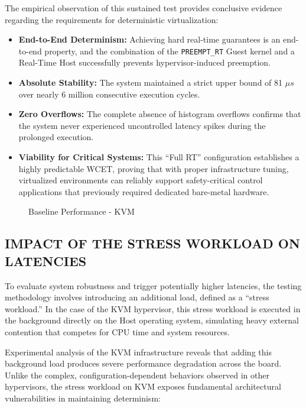 The empirical observation of this sustained test provides conclusive
evidence regarding the requirements for deterministic virtualization:

\begin{itemize}
\item
  \textbf{End-to-End Determinism:} Achieving hard real-time guarantees
  is an end-to-end property, and the combination of the
  \texttt{PREEMPT\_RT} Guest kernel and a Real-Time Host successfully
  prevents hypervisor-induced preemption.
\item
  \textbf{Absolute Stability:} The system maintained a strict upper
  bound of 81 $\mu s$ over nearly 6 million consecutive execution cycles.
\item
  \textbf{Zero Overflows:} The complete absence of histogram overflows
  confirms that the system never experienced uncontrolled latency spikes
  during the prolonged execution.
\item
  \textbf{Viability for Critical Systems:} This ``Full RT''
  configuration establishes a highly predictable WCET, proving that with
  proper infrastructure tuning, virtualized environments can reliably
  support safety-critical control applications that previously required
  dedicated bare-metal hardware.
\end{itemize}

\begin{figure}
\centering

\caption{Baseline Performance - KVM}
\end{figure}

\subsection{IMPACT OF THE STRESS WORKLOAD ON
LATENCIES}\label{impact-of-the-stress-workload-on-latencies}

To evaluate system robustness and trigger potentially higher latencies,
the testing methodology involves introducing an additional load, defined
as a ``stress workload.'' In the case of the KVM hypervisor, this stress
workload is executed in the background directly on the Host operating
system, simulating heavy external contention that competes for CPU time
and system resources.

Experimental analysis of the KVM infrastructure reveals that adding this
background load produces severe performance degradation across the
board. Unlike the complex, configuration-dependent behaviors observed in
other hypervisors, the stress workload on KVM exposes fundamental
architectural vulnerabilities in maintaining determinism:

